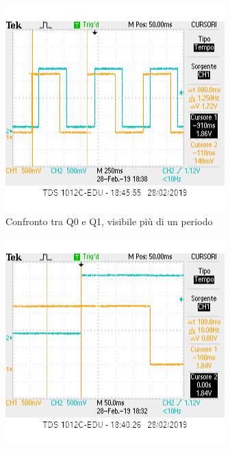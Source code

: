 \documentclass[10pt,a4paper]{article}
\begin{document}
\begin{figure}[h]
	\centering
	\begin{subfigure}[b]{0.4\linewidth}
		\includegraphics[width=\linewidth]{q0q1periodo sr.png}
		\caption{Confronto tra Q0 e Q1, visibile più di un periodo}
	\end{subfigure}
	\newline
	\begin{subfigure}[b]{0.4\linewidth}
		\includegraphics[width=\linewidth]{q0q2 sr.png}

\end{subfigure}
\end{figure}
\end{document}
